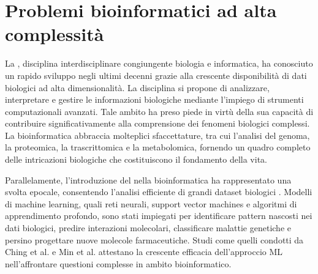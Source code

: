 % 
% 
% 



\clearpage
\cleardoublepage

\chapter{Problemi bioinformatici ad alta complessità}

La , disciplina interdisciplinare congiungente biologia e informatica, ha conosciuto un rapido sviluppo negli ultimi decenni grazie alla crescente disponibilità di dati biologici ad alta dimensionalità. La disciplina si propone di analizzare, interpretare e gestire le informazioni biologiche mediante l'impiego di strumenti computazionali avanzati. Tale ambito ha preso piede in virtù della sua capacità di contribuire significativamente alla comprensione dei fenomeni biologici complessi. La bioinformatica abbraccia molteplici sfaccettature, tra cui l'analisi del genoma, la proteomica, la trascrittomica e la metabolomica, fornendo un quadro completo delle intricazioni biologiche che costituiscono il fondamento della vita.

Parallelamente, l'introduzione del  nella bioinformatica ha rappresentato una svolta epocale, consentendo l'analisi efficiente di grandi dataset biologici \cite{lecun2015deep, angermueller2016deep}. Modelli di machine learning, quali reti neurali, support vector machines e algoritmi di apprendimento profondo, sono stati impiegati per identificare pattern nascosti nei dati biologici, predire interazioni molecolari, classificare malattie genetiche e persino progettare nuove molecole farmaceutiche. Studi come quelli condotti da Ching et al. \cite{ching2018deep} e Min et al. \cite{min2017deep} attestano la crescente efficacia dell'approccio ML nell'affrontare questioni complesse in ambito bioinformatico.

